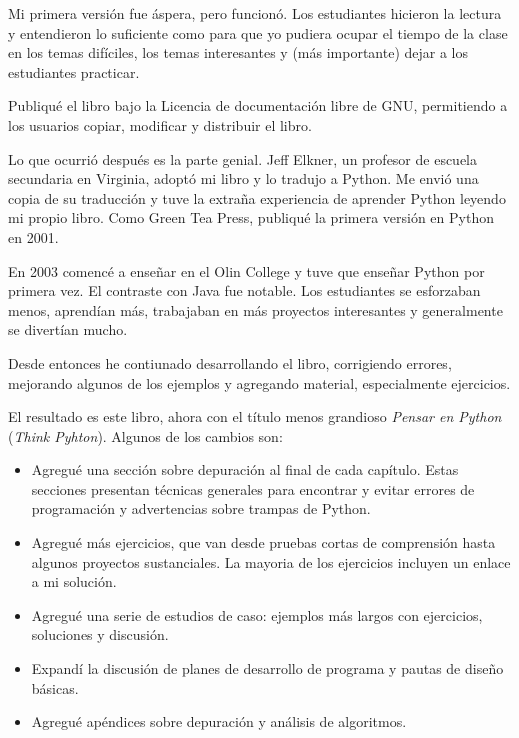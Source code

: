 \documentclass[10pt]{book}
\begin{document}
Mi primera versión fue áspera, pero funcionó.  Los estudiantes hicieron la
lectura y entendieron lo suficiente como para que yo pudiera ocupar el tiempo
de la clase en los temas difíciles, los temas interesantes y (más importante)
dejar a los estudiantes practicar.

Publiqué el libro bajo la Licencia de documentación libre de GNU,
permitiendo a los usuarios copiar, modificar y distribuir el libro.

Lo que ocurrió después es la parte genial.  Jeff Elkner, un profesor
de escuela secundaria en Virginia, adoptó mi libro y lo tradujo a Python.
Me envió una copia de su traducción y tuve la extraña experiencia de
aprender Python leyendo mi propio libro. Como Green Tea Press,
publiqué la primera versión en Python en 2001.

En 2003 comencé a enseñar en el Olin College y tuve que enseñar Python
por primera vez.  El contraste con Java fue notable.
Los estudiantes se esforzaban menos, aprendían más, trabajaban en más
proyectos interesantes y generalmente se divertían mucho.

Desde entonces he contiunado desarrollando el libro,
corrigiendo errores, mejorando algunos de los ejemplos y agregando material,
especialmente ejercicios.

El resultado es este libro, ahora con el título menos grandioso
{\em Pensar en Python} ({\em Think Pyhton}).  Algunos de los cambios son:

\begin{itemize}

\item Agregué una sección sobre depuración al final de cada capítulo.
  Estas secciones presentan técnicas generales para encontrar y evitar
  errores de programación y advertencias sobre trampas de Python.

\item Agregué más ejercicios, que van desde pruebas cortas de comprensión
  hasta algunos proyectos sustanciales.  La mayoria de los ejercicios
  incluyen un enlace a mi solución.

\item Agregué una serie de estudios de caso: ejemplos más largos con
  ejercicios, soluciones y discusión.

\item Expandí la discusión de planes de desarrollo de programa y
  pautas de diseño básicas.

\item Agregué apéndices sobre depuración y análisis de algoritmos.

\end{itemize}
\end{document}

